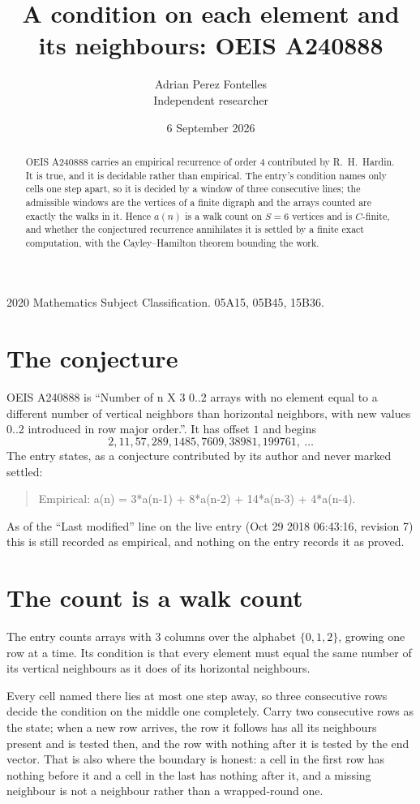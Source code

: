 \documentclass[11pt,a4paper]{article}
\title{A condition on each element and its neighbours: OEIS A240888}
\author{Adrian Perez Fontelles\\ \small Independent researcher}
\date{6 September 2026}
\theoremstyle{plain}
\theoremstyle{definition}
\begin{document}
\maketitle

\begin{abstract}
OEIS A240888 carries an empirical recurrence of order $4$ contributed by R.~H.~Hardin. It is
true, and it is decidable rather than empirical. The entry's condition names only cells one step apart, so it is decided by a window of
three consecutive lines; the
admissible windows are the vertices of a finite digraph and the arrays counted are exactly the
walks in it. Hence $a(n)$ is a walk count on $S=6$ vertices and is $C$-finite, and whether the
conjectured recurrence annihilates it is settled by a finite exact computation, with the
Cayley--Hamilton theorem bounding the work.
\end{abstract}

\noindent\small 2020 Mathematics Subject Classification. 05A15, 05B45, 15B36.\normalsize

\section{The conjecture}

OEIS A240888 is ``Number of n X 3 0..2 arrays with no element equal to a different number of vertical neighbors than horizontal neighbors, with new values 0..2 introduced in row major order.''. It has offset $1$ and begins
\[
2, 11, 57, 289, 1485, 7609, 38981, 199761,\ \dots
\]
The entry states, as a conjecture contributed by its author and never marked settled:
\begin{quote}
Empirical: a(n) = 3*a(n-1) + 8*a(n-2) + 14*a(n-3) + 4*a(n-4).
\end{quote}
As of the ``Last modified'' line on the live entry (Oct 29 2018 06:43:16, revision 7) this is still
recorded as empirical, and nothing on the entry records it as proved.

\section{The count is a walk count}

The entry counts arrays with $3$ columns over the alphabet $\{0,1,2\}$, growing one row at a time. Its condition is that every element must equal the same number of its vertical neighbours as it does of its horizontal neighbours.

Every cell named there lies at most one step away, so three consecutive rows decide the condition on the middle one completely. Carry two consecutive rows as the state; when a new row arrives, the row it follows has all its neighbours present and is tested then, and the row with nothing after it is tested by the end vector. That is also where the boundary is honest: a cell in the first row has nothing before it and a cell in the last has nothing after it, and a missing neighbour is not a neighbour rather than a wrapped-round one.
\end{document}
